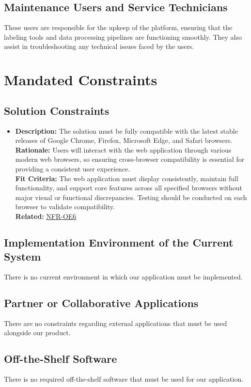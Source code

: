 \documentclass[12pt]{article}
\begin{document}
\subsection{Maintenance Users and Service Technicians}
These users are responsible for the upkeep of the platform, ensuring that the labeling tools and data processing pipelines are functioning smoothly. They also assist in troubleshooting any technical issues faced by the users.

\newpage
\section{Mandated Constraints}
\subsection{Solution Constraints}
\begin{itemize}
  \item \textbf{Description:} The solution must be fully compatible with the latest stable releases of Google Chrome, Firefox, Microsoft Edge, and Safari browsers.\\ \textbf{Rationale:} Users will interact with the web application through various modern web browsers, so ensuring cross-browser compatibility is essential for providing a consistent user experience. \\ \textbf{Fit Criteria:} The web application must display consistently, maintain full functionality, and support core features across all specified browsers without major visual or functional discrepancies. Testing should be conducted on each browser to validate compatibility. \\ \textbf{Related:}  \hyperref[sec:OE6]{NFR-OE6}
\end{itemize}
\subsection{Implementation Environment of the Current System}
There is no current environment in which our application must be implemented.
\subsection{Partner or Collaborative Applications}
There are no constraints regarding external applications that must be used alongside our product.
\subsection{Off-the-Shelf Software}
There is no required off-the-shelf software that must be used for our application.
\end{document}
